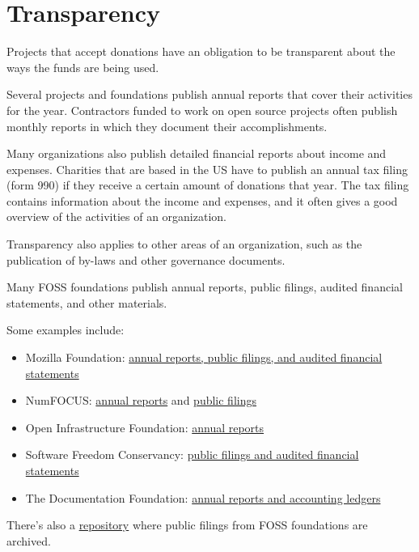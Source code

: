 


\chapter{Transparency}

Projects that accept donations have an obligation to be transparent about the ways the funds are being used.

Several projects and foundations publish annual reports that cover their activities for the year.  Contractors funded to work on open source projects often publish monthly reports in which they document their accomplishments.

Many organizations also publish detailed financial reports about income and expenses.  Charities that are based in the US have to publish an annual tax filing (form 990) if they receive a certain amount of donations that year.  The tax filing contains information about the income and expenses, and it often gives a good overview of the activities of an organization.

Transparency also applies to other areas of an organization, such as the publication of by-laws and other governance documents.

\begin{kaobox}[frametitle=Transparency of FOSS foundations]

Many FOSS foundations publish annual reports, public filings, audited financial statements, and other materials.

Some examples include:

\begin{itemize}

\item Mozilla Foundation: \href{https://www.mozilla.org/en-US/foundation/annualreport}{annual reports, public filings, and audited financial statements}
\item NumFOCUS: \href{https://numfocus.org/community/mission/annual-reports}{annual reports} and \href{https://numfocus.org/legal}{public filings}
\item Open Infrastructure Foundation: \href{https://openinfra.dev/about/}{annual reports}
\item Software Freedom Conservancy: \href{https://sfconservancy.org/about/filings/}{public filings and audited financial statements}
\item The Documentation Foundation: \href{https://www.documentfoundation.org/foundation/financials/}{annual reports and accounting ledgers}

\end{itemize}

There's also a \href{https://gitlab.com/floss-foundations/npo-public-filings}{repository} where public filings from FOSS foundations are archived.

\end{kaobox}

